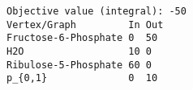 \begin{verbatim}
Objective value (integral): -50
Vertex/Graph         In Out 
Fructose-6-Phosphate 0  50  
H2O                  10 0   
Ribulose-5-Phosphate 60 0   
p_{0,1}              0  10  
\end{verbatim}
